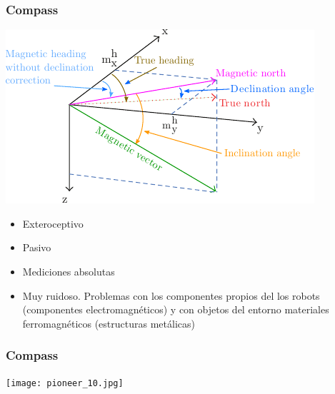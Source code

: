 \begin{frame}
    \frametitle{Compass}

    \begin{center}
        \includegraphics[width=0.5\columnwidth]{images/magnetic_field.pdf}
    \end{center}

    \begin{itemize}
        \item Exteroceptivo
        \item Pasivo
        \item Mediciones absolutas
        \item Muy ruidoso. Problemas con los componentes propios del los robots (componentes electromagnéticos) y con objetos del entorno materiales ferromagnéticos (estructuras metálicas)
    \end{itemize}
\end{frame}

\begin{frame}
    \frametitle{Compass}

    \begin{center}
        \texttt{[image: pioneer\_10.jpg]}
    \end{center}
\end{frame}


